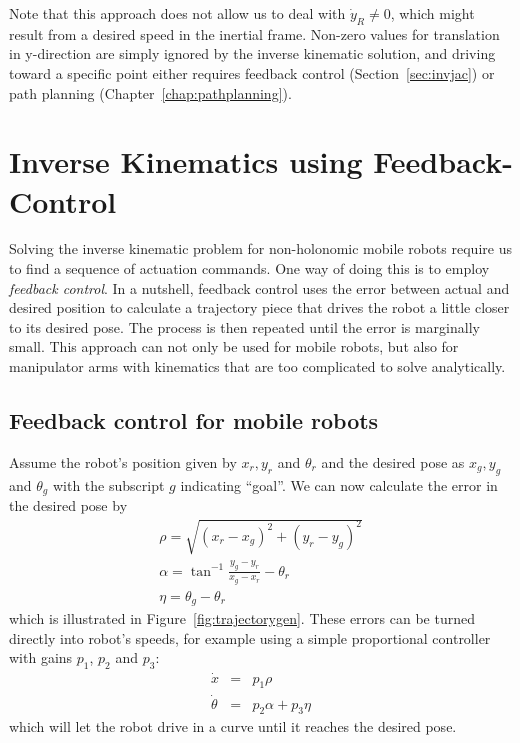Note that this approach does not allow us to deal with $\dot{y}_R \neq 0$, which might result from a desired speed in the inertial frame. Non-zero values for translation in y-direction are simply ignored by the inverse kinematic solution, and driving toward a specific point either requires feedback control (Section~\ref{sec:invjac}) or path planning (Chapter~\ref{chap:pathplanning}).


\section{Inverse Kinematics using Feedback-Control}\label{sec:advinvkinematics}
Solving the inverse kinematic problem for non-holonomic mobile robots require us to find a sequence of actuation commands. One way of doing this is to employ \emph{feedback control}. In a nutshell, feedback control uses the error between actual and desired position to calculate a trajectory piece that drives the robot a little closer to its desired pose. The process is then repeated until the error is marginally small. This approach can not only be used for mobile robots, but also for manipulator arms with kinematics that are too complicated to solve analytically.

\subsection{Feedback control for mobile robots}\label{sec:fbmobile}
Assume the robot's position given by $x_r, y_r$ and $\theta_r$ and the desired pose as $x_g, y_g$ and $\theta_g$ with the subscript $g$ indicating ``goal''.
We can now calculate the error in the desired pose by
\begin{eqnarray}
\rho=\sqrt{(x_r-x_g)^2+(y_r-y_g)^2}\\
\nonumber
\alpha=\tan^{-1}{\frac{y_g-y_r}{x_g-x_r}}-\theta_r\\
\nonumber
\eta=\theta_g-\theta_r
\end{eqnarray}
which is illustrated in Figure~\ref{fig:trajectorygen}.
These errors can be turned directly into robot's speeds, for example using a simple proportional controller with gains $p_1$, $p_2$ and $p_3$:
\begin{eqnarray}
\dot{x} &=& p_1 \rho\\
\dot{\theta} &=& p_2 \alpha + p_3 \eta
\end{eqnarray}
which will let the robot drive in a curve until it reaches the desired pose.

